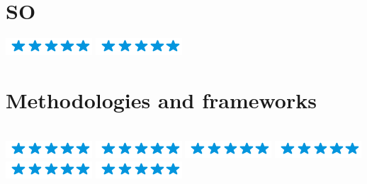 \documentclass[american]{cv-class}
\begin{document}
\begin{aside}
	\section{SO}
	{\includegraphics[scale=0.40]{img/5stars.png}}
	{\includegraphics[scale=0.40]{img/5stars.png}}
	~
	\section{Methodologies and frameworks } \\
	{\includegraphics[scale=0.40]{img/5stars.png}}
	{\includegraphics[scale=0.40]{img/5stars.png}}
	{\includegraphics[scale=0.40]{img/5stars.png}}
	{\includegraphics[scale=0.40]{img/5stars.png}}
	{\includegraphics[scale=0.40]{img/5stars.png}}
	{\includegraphics[scale=0.40]{img/5stars.png}}
	    
	~

\end{aside}
\end{document}
